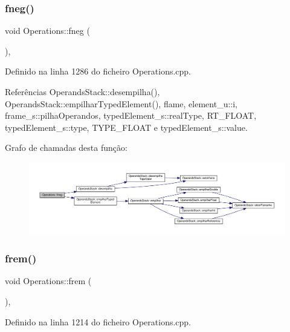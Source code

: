 \subsubsection{\texorpdfstring{fneg()}{fneg()}}
{\footnotesize\ttfamily void Operations\+::fneg (\begin{DoxyParamCaption}{ }\end{DoxyParamCaption})\hspace{0.3cm}{\ttfamily [static]}, {\ttfamily [private]}}



Definido na linha 1286 do ficheiro Operations.\+cpp.



Referências Operands\+Stack\+::desempilha(), Operands\+Stack\+::empilhar\+Typed\+Element(), flame, element\+\_\+u\+::i, frame\+\_\+s\+::pilha\+Operandos, typed\+Element\+\_\+s\+::real\+Type, R\+T\+\_\+\+F\+L\+O\+AT, typed\+Element\+\_\+s\+::type, T\+Y\+P\+E\+\_\+\+F\+L\+O\+AT e typed\+Element\+\_\+s\+::value.

Grafo de chamadas desta função\+:
\nopagebreak
\begin{figure}[H]
\begin{center}
\leavevmode
\includegraphics[width=350pt]{classOperations_a17a7d8f333373d30ae5b1595d96594e5_cgraph}
\end{center}
\end{figure}
\mbox{\label{classOperations_ad29eac4f222e4b74667086c3da0d5538}} 
\subsubsection{\texorpdfstring{frem()}{frem()}}
{\footnotesize\ttfamily void Operations\+::frem (\begin{DoxyParamCaption}{ }\end{DoxyParamCaption})\hspace{0.3cm}{\ttfamily [static]}, {\ttfamily [private]}}



Definido na linha 1214 do ficheiro Operations.\+cpp.



